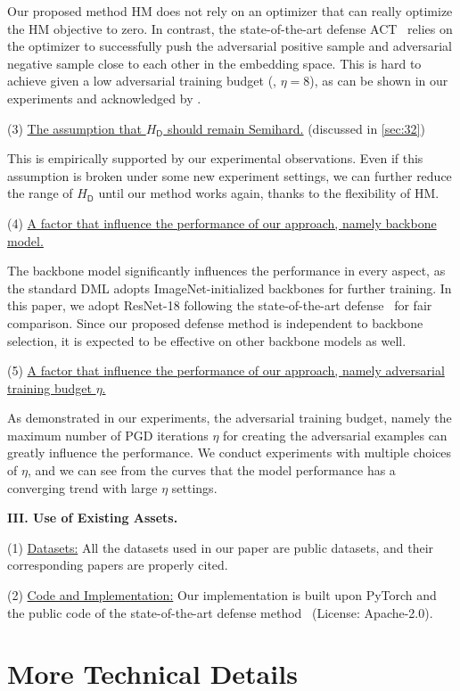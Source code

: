 Our proposed method HM does not rely on an optimizer that can really optimize
the HM objective to zero.
%
In contrast, the state-of-the-art defense ACT~\cite{robrank} relies on the
optimizer to successfully push the adversarial positive sample and adversarial
negative sample close to each other in the embedding space.
%
This is hard to achieve given a low adversarial training budget (\eg, $\eta=8$),
as can be shown in our experiments and acknowledged by \cite{robrank}.

(3) \ul{The assumption that $H_\mathsf{D}$ should remain Semihard.}
(discussed in \cref{sec:32})

This is empirically supported by our experimental observations.
%
Even if this assumption is broken under some new experiment settings,
we can further reduce the range of $H_\mathsf{D}$ until our method works again,
thanks to the flexibility of HM.

(4) \ul{A factor that influence the performance of our approach, namely
backbone model.}

The backbone model significantly influences the performance in every aspect, as
the standard DML adopts ImageNet-initialized backbones for further training.
%
In this paper, we adopt ResNet-18 following the state-of-the-art
defense~\cite{robrank} for fair comparison.
%
Since our proposed defense method is independent to backbone selection, it is
expected to be effective on other backbone models as well.

(5) \ul{A factor that influence the performance of our approach, namely
adversarial training budget $\eta$.}

As demonstrated in our experiments, the adversarial training budget, namely the
maximum number of PGD iterations $\eta$ for creating the adversarial examples
can greatly influence the performance.
%
We conduct experiments with multiple choices of $\eta$, and we can see from the
curves that the model performance has a converging trend with large $\eta$
settings.

\noindent\textbf{III. Use of Existing Assets.}

(1) \ul{Datasets:} All the datasets used in our paper are public datasets,
and their corresponding papers are properly cited.

(2) \ul{Code and Implementation:} Our implementation is built upon PyTorch
and the public code of the state-of-the-art defense method~\cite{robrank}
(License: Apache-2.0).

\section{More Technical Details}

